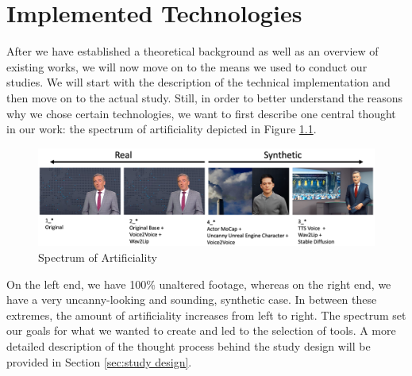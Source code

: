 \documentclass[
  a4paper,  %
  twoside,  %
  bibliography=totoc,
  headsepline,
  cleardoublepage=empty,
  parskip=half,
  draft=false
]{scrbook}
\begin{document}
\chapter{Implemented Technologies}
\label{chap:implementation}
After we have established a theoretical background as well as an overview of existing works, we will now move on to the means we used to conduct our studies. We will start with the description of the technical implementation and then move on to the actual study. Still, in order to better understand the reasons why we chose certain technologies, we want to first describe one central thought in our work: the spectrum of artificiality depicted in Figure \ref{fig:spectrum}.

\begin{figure}[h]
  \centering
  \includegraphics[width=1\textwidth]{./graphics/spectrum-art.png}
  \caption{Spectrum of Artificiality}
  \label{fig:spectrum}
\end{figure}

On the left end, we have 100\% unaltered footage, whereas on the right end, we have a very uncanny-looking and sounding, synthetic case. In between these extremes, the amount of artificiality increases from left to right. The spectrum set our goals for what we wanted to create and led to the selection of tools. A more detailed description of the thought process behind the study design will be provided in Section \ref{sec:study design}.
\end{document}
